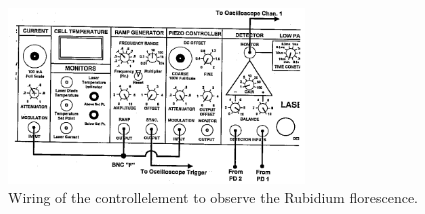 \begin{figure}
  \centering
  \includegraphics[width=0.7\textwidth]{wiring2.png}
  \caption{Wiring of the controllelement to observe the Rubidium florescence.\cite{V61}}
  \label{fig:dl_controll2}
\end{figure}

